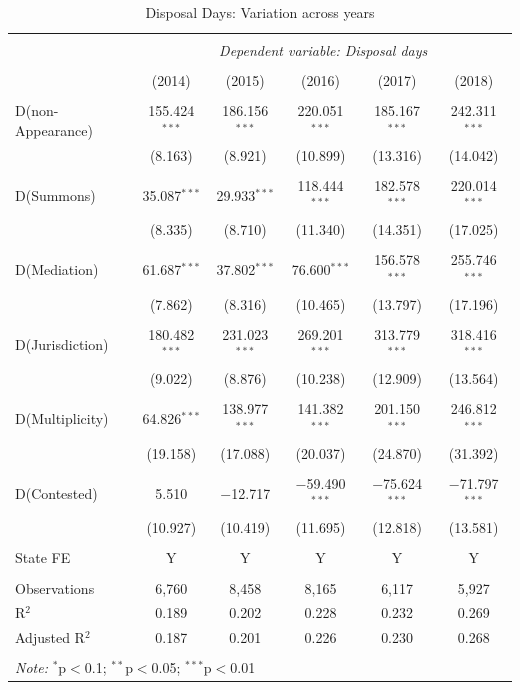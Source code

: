  \begin{longtable}{lcc|ccc} 
 \caption{Disposal Days: Variation across years}\label{tab:yearFE}
 \\[-1.8ex]
 \hline \\[-1.8ex] 
 & \multicolumn{5}{c}{\textit{Dependent variable: Disposal days}} \\ 
 \cline{2-6} 
 \\[-1.8ex] & (2014) & (2015) & (2016) & (2017) & (2018)\\ 
 \hline \\[-1.8ex]
 
 D(non-Appearance) & 155.424$^{***}$ & 186.156$^{***}$ & 220.051$^{***}$ & 185.167$^{***}$ & 242.311$^{***}$ \\ 
 & (8.163) & (8.921) & (10.899) & (13.316) & (14.042) \\ 
 & & & & & \\ 
 D(Summons) & 35.087$^{***}$ & 29.933$^{***}$ & 118.444$^{***}$ & 182.578$^{***}$ & 220.014$^{***}$ \\ 
 & (8.335) & (8.710) & (11.340) & (14.351) & (17.025) \\ 
 & & & & & \\ 
 D(Mediation) & 61.687$^{***}$ & 37.802$^{***}$ & 76.600$^{***}$ & 156.578$^{***}$ & 255.746$^{***}$ \\ 
 & (7.862) & (8.316) & (10.465) & (13.797) & (17.196) \\ 
 & & & & & \\ 
 D(Jurisdiction) & 180.482$^{***}$ & 231.023$^{***}$ & 269.201$^{***}$ & 313.779$^{***}$ & 318.416$^{***}$ \\ 
 & (9.022) & (8.876) & (10.238) & (12.909) & (13.564) \\ 
 & & & & & \\ 
 D(Multiplicity) & 64.826$^{***}$ & 138.977$^{***}$ & 141.382$^{***}$ & 201.150$^{***}$ & 246.812$^{***}$ \\ 
 & (19.158) & (17.088) & (20.037) & (24.870) & (31.392) \\ 
 & & & & & \\ 
 D(Contested) & 5.510 & $-$12.717 & $-$59.490$^{***}$ & $-$75.624$^{***}$ & $-$71.797$^{***}$ \\ 
 & (10.927) & (10.419) & (11.695) & (12.818) & (13.581) \\

 \hline \\[-1.8ex]
 State FE & Y & Y & Y & Y & Y \\
 \hline \\[-1.8ex] 
 
 Observations & 6,760 & 8,458 & 8,165 & 6,117 & 5,927 \\ 
 R$^{2}$ & 0.189 & 0.202 & 0.228 & 0.232 & 0.269 \\ 
 Adjusted R$^{2}$ & 0.187 & 0.201 & 0.226 & 0.230 & 0.268 \\
 
 \hline \\[-1.8ex] 
 \multicolumn{6}{l}{\textit{Note:} $^{*}$p$<$0.1; $^{**}$p$<$0.05; $^{***}$p$<$0.01} \\
\end{longtable}

